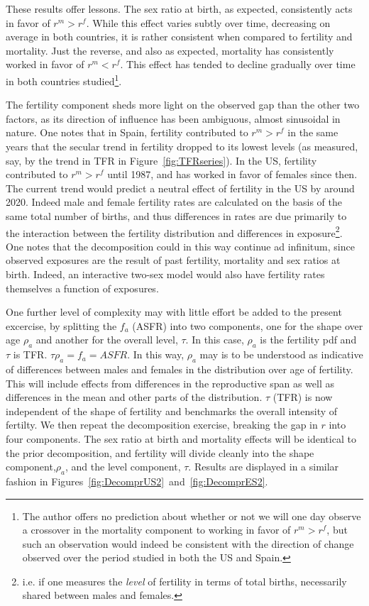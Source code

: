 These results offer lessons. The sex ratio at birth, as
expected, consistently acts in favor of $r^m > r^f$. While this effect varies
subtly over time, decreasing on average in both countries, it is rather
consistent when compared to fertility and mortality. Just the reverse, and 
also as expected, mortality has consistently worked in
favor of $r^m < r^f$. This effect has tended to decline gradually over time in
both countries studied\footnote{The author offers no prediction about whether or
not we will one day observe a crossover in the mortality component to working
in favor of $r^m > r^f$, but such an observation would indeed be consistent
with the direction of change observed over the period studied in both the US
and Spain.}. 

The fertility component sheds more light on the observed gap than
the other two factors, as its direction of influence has been ambiguous, almost
sinusoidal in nature. One notes that in Spain, fertility
contributed to $r^m > r^f$ in the same years that the secular trend in fertility
dropped to its lowest levels (as measured, say, by the trend
in TFR in Figure~\ref{fig:TFRseries}). In the US, fertility contributed to $r^m
> r^f$ until 1987, and has worked in favor of females since then. The current
trend would predict a neutral effect of fertility in the US by around 2020.
Indeed male and female fertility rates are calculated on the basis of the same
total number of births, and thus differences in rates are due primarily to the
interaction between the fertility distribution and differences in
exposure\footnote{i.e. if one measures the \textit{level} of fertility in
terms of total births, necessarily shared between males and females.}. One notes
that the decomposition could in this way continue ad infinitum, since 
observed exposures are the result of past fertility, mortality and sex
 ratios at birth. Indeed, an interactive two-sex model would also have fertility rates
themselves a function of exposures.

One further level of complexity may with little effort be added to the present
excercise, by splitting the $f_a$ (ASFR) into two components, one for the shape
over age $\rho _a$ and another for the overall level, $\tau$. In this case, 
$\rho _a$ is the fertility pdf and $\tau$ is TFR. $\tau \rho _a = f_a = ASFR$.
In this way, $\rho _a$ may is to be understood as indicative of differences
between males and females in the distribution over age of fertility. This will
include effects from differences in the reproductive span as well as differences
in the mean and other parts of the distribution. $\tau$ (TFR) is now independent
of the shape of fertility and benchmarks the overall intensity of fertilty. We
then repeat the decomposition exercise, breaking the gap in $r$ into four
components. The sex ratio at birth and mortality effects will be identical to
the prior decomposition, and fertility will divide cleanly into the shape
component,$\rho _a$, and the level component, $\tau$. Results are displayed in a
similar fashion in Figures~\ref{fig:DecomprUS2}~and~\ref{fig:DecomprES2}.

